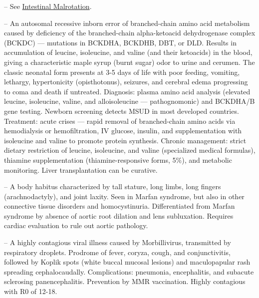 -- See \hyperlink{Intestinal Malrotation}{Intestinal Malrotation}.

-- An autosomal recessive inborn error of branched-chain amino acid metabolism caused by deficiency of the branched-chain alpha-ketoacid dehydrogenase complex (BCKDC) — mutations in BCKDHA, BCKDHB, DBT, or DLD. Results in accumulation of leucine, isoleucine, and valine (and their ketoacids) in the blood, giving a characteristic maple syrup (burnt sugar) odor to urine and cerumen. The classic neonatal form presents at 3-5 days of life with poor feeding, vomiting, lethargy, hypertonicity (opisthotonus), seizures, and cerebral edema progressing to coma and death if untreated. Diagnosis: plasma amino acid analysis (elevated leucine, isoleucine, valine, and alloisoleucine — pathognomonic) and BCKDHA/B gene testing. Newborn screening detects MSUD in most developed countries. Treatment: acute crises — rapid removal of branched-chain amino acids via hemodialysis or hemofiltration, IV glucose, insulin, and supplementation with isoleucine and valine to promote protein synthesis. Chronic management: strict dietary restriction of leucine, isoleucine, and valine (specialized medical formulas), thiamine supplementation (thiamine-responsive forms, 5\%), and metabolic monitoring. Liver transplantation can be curative.

-- A body habitus characterized by tall stature, long limbs, long fingers (arachnodactyly), and joint laxity. Seen in Marfan syndrome, but also in other connective tissue disorders and homocystinuria. Differentiated from Marfan syndrome by absence of aortic root dilation and lens subluxation. Requires cardiac evaluation to rule out aortic pathology.

-- A highly contagious viral illness caused by Morbillivirus, transmitted by respiratory droplets. Prodrome of fever, coryza, cough, and conjunctivitis, followed by Koplik spots (white buccal mucosal lesions) and maculopapular rash spreading cephalocaudally. Complications: pneumonia, encephalitis, and subacute sclerosing panencephalitis. Prevention by MMR vaccination. Highly contagious with R0 of 12-18.

